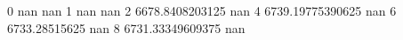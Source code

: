 0 nan nan
1 nan nan
2 6678.8408203125 nan
4 6739.19775390625 nan
6 6733.28515625 nan
8 6731.33349609375 nan
